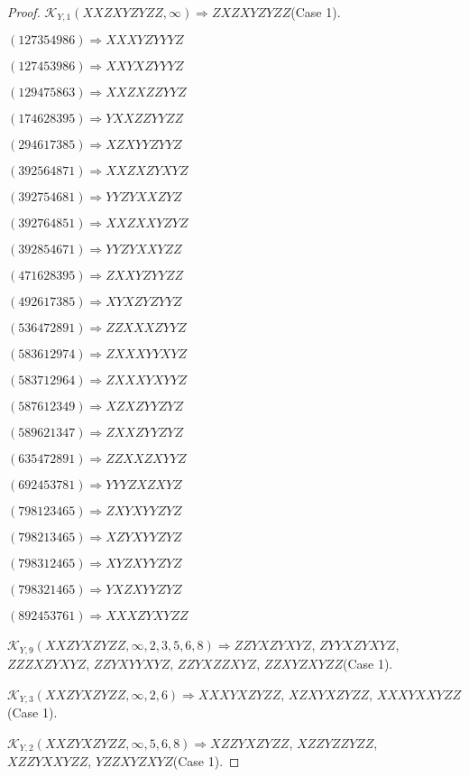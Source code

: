 \documentclass[12pt]{article}
\theoremstyle{plain}
\theoremstyle{definition}
\theoremstyle{remark}
\newcommand{\fancy}[1]{\mathcal{#1}}
\def\K{\fancy{K}}
\begin{document}
\begin{proof}
	$\K_{Y,1}(XXZXYZYZZ,\infty)\Rightarrow $$ZXZXYZYZZ$(Case 1).
	
	
	
	$(1 2 7 3 5 4 9 8 6)\Rightarrow XXXYZYYYZ$
	
	$(1 2 7 4 5 3 9 8 6)\Rightarrow XXYXZYYYZ$
	
	$(1 2 9 4 7 5 8 6 3)\Rightarrow XXZXZZYYZ$
	
	$(1 7 4 6 2 8 3 9 5)\Rightarrow YXXZZYYZZ$
	
	$(2 9 4 6 1 7 3 8 5)\Rightarrow XZXYYZYYZ$
	
	$(3 9 2 5 6 4 8 7 1)\Rightarrow XXZXZYXYZ$
	
	$(3 9 2 7 5 4 6 8 1)\Rightarrow YYZYXXZYZ$
	
	$(3 9 2 7 6 4 8 5 1)\Rightarrow XXZXXYZYZ$
	
	$(3 9 2 8 5 4 6 7 1)\Rightarrow YYZYXXYZZ$
	
	$(4 7 1 6 2 8 3 9 5)\Rightarrow ZXXYZYYZZ$
	
	$(4 9 2 6 1 7 3 8 5)\Rightarrow XYXZYZYYZ$
	
	$(5 3 6 4 7 2 8 9 1)\Rightarrow ZZXXXZYYZ$
	
	$(5 8 3 6 1 2 9 7 4)\Rightarrow ZXXXYYXYZ$
	
	$(5 8 3 7 1 2 9 6 4)\Rightarrow ZXXXYXYYZ$
	
	$(5 8 7 6 1 2 3 4 9)\Rightarrow XZXZYYZYZ$
	
	$(5 8 9 6 2 1 3 4 7)\Rightarrow ZXXZYYZYZ$
	
	$(6 3 5 4 7 2 8 9 1)\Rightarrow ZZXXZXYYZ$
	
	$(6 9 2 4 5 3 7 8 1)\Rightarrow YYYZXZXYZ$
	
	$(7 9 8 1 2 3 4 6 5)\Rightarrow ZXYXYYZYZ$
	
	$(7 9 8 2 1 3 4 6 5)\Rightarrow XZYXYYZYZ$
	
	$(7 9 8 3 1 2 4 6 5)\Rightarrow XYZXYYZYZ$
	
	$(7 9 8 3 2 1 4 6 5)\Rightarrow YXZXYYZYZ$
	
	$(8 9 2 4 5 3 7 6 1)\Rightarrow XXXZYXYZZ$
	
	
	
	$\K_{Y,9}(XXZYXZYZZ,\infty,2, 3, 5, 6, 8)\Rightarrow $$ZZYXZYXYZ$, $ZYYXZYXYZ$, $ZZZXZYXYZ$, $ZZYXYYXYZ$, $ZZYXZZXYZ$, $ZZXYZXYZZ$(Case 1).
	
	$\K_{Y,3}(XXZYXZYZZ,\infty,2, 6)\Rightarrow $$XXXYXZYZZ$, $XZXYXZYZZ$, $XXXYXXYZZ$(Case 1).
	
	$\K_{Y,2}(XXZYXZYZZ,\infty,5, 6, 8)\Rightarrow $$XZZYXZYZZ$, $XZZYZZYZZ$, $XZZYXXYZZ$, $YZZXYZXYZ$(Case 1).
	

\end{proof}
\end{document}
